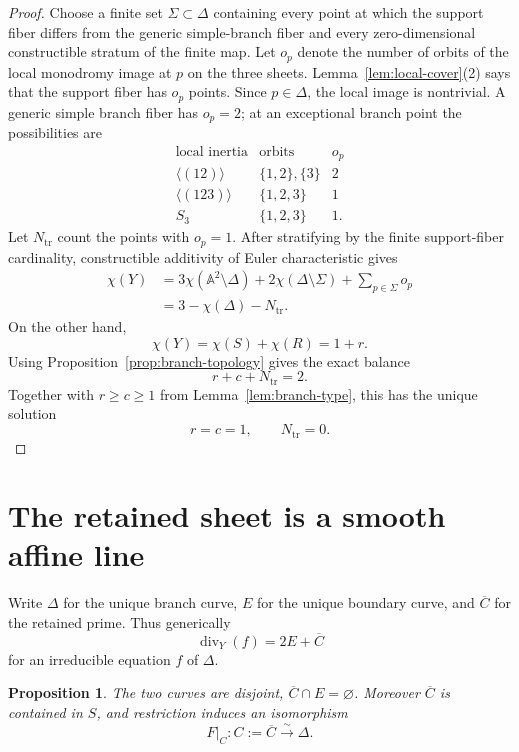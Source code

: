 \documentclass[11pt]{article}
\newtheorem{proposition}[theorem]{Proposition}
\theoremstyle{definition}
\theoremstyle{remark}
\newcommand{\A}{\mathbb A}
\newcommand{\divisor}{\operatorname{div}}
\begin{document}
\begin{proof}
Choose a finite set \(\Sigma\subset\Delta\) containing every point at
which the support fiber differs from the generic simple-branch fiber
and every zero-dimensional constructible stratum of the finite map.
Let \(o_p\) denote the number of orbits of the local monodromy image
at \(p\) on the three sheets.  Lemma~\ref{lem:local-cover}(2) says
that the support fiber has \(o_p\) points.  Since \(p\in\Delta\), the
local image is nontrivial.  A generic simple branch fiber has
\(o_p=2\); at an exceptional branch point the possibilities are
\[
\begin{array}{c|c|c}
\text{local inertia}&\text{orbits}&o_p\\ \hline
\langle(12)\rangle&\{1,2\},\{3\}&2\\
\langle(123)\rangle&\{1,2,3\}&1\\
S_3&\{1,2,3\}&1.
\end{array}
\]
Let \(N_{\mathrm{tr}}\) count the points with \(o_p=1\).
After stratifying by the finite support-fiber cardinality,
constructible additivity of Euler characteristic gives
\[
\begin{aligned}
\chi(Y)
 &=3\chi(\A^2\setminus\Delta)
   +2\chi(\Delta\setminus\Sigma)+\sum_{p\in\Sigma}o_p\\
 &=3-\chi(\Delta)-N_{\mathrm{tr}}.
\end{aligned}
\tag{3.6}
\]
On the other hand,
\[
\chi(Y)=\chi(S)+\chi(R)=1+r.
\]
Using Proposition~\ref{prop:branch-topology} gives the exact balance
\[
 r+c+N_{\mathrm{tr}}=2.
\tag{3.7}
\]
Together with \(r\ge c\ge1\) from
Lemma~\ref{lem:branch-type}, this has the unique solution
\[
 r=c=1,\qquad N_{\mathrm{tr}}=0.
\]
\end{proof}

\section{The retained sheet is a smooth affine line}

Write \(\Delta\) for the unique branch curve, \(E\) for the unique
boundary curve, and \(\overline C\) for the retained prime.  Thus
generically
\[
 \divisor_Y(f)=2E+\overline C
\tag{4.1}
\]
for an irreducible equation \(f\) of \(\Delta\).

\begin{proposition}\label{prop:retained}
The two curves are disjoint, \(\overline C\cap E=\varnothing\).
Moreover \(\overline C\) is contained in \(S\), and restriction induces
an isomorphism
\[
 F|_C:C:=\overline C\xrightarrow{\ \sim\ }\Delta.
\tag{4.2}
\]
\end{proposition}
\end{document}

